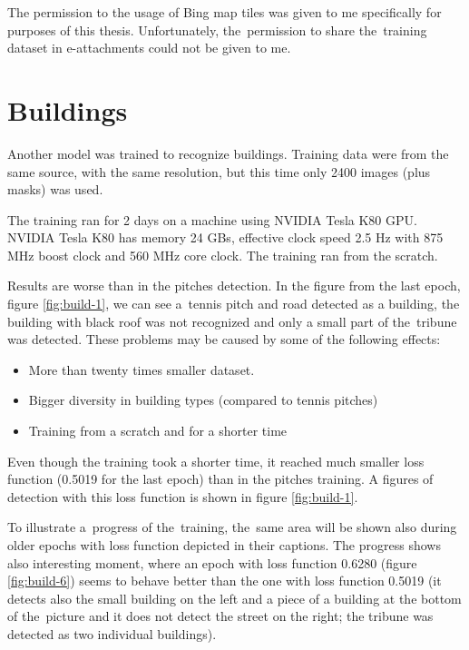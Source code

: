 The permission to the usage of Bing map tiles was given to me specifically for 
purposes of this thesis. Unfortunately, the~permission to share the~training 
dataset in e-attachments could not be given to me.

\section{Buildings}

Another model was trained to recognize buildings. Training data were from the
same source, with the same resolution, but this time only 2400 images (plus
masks) was used.

The training ran for 2 days on a machine using NVIDIA Tesla K80 GPU. NVIDIA
Tesla K80 has memory 24 GBs, effective clock speed 2.5 Hz with 875 MHz boost
clock and 560 MHz core clock. The training ran from the scratch.

Results are worse than in the pitches detection. In the figure from the last
epoch, figure \ref{fig:build-1},
we can see a~tennis pitch and road detected as a building, the building with
black roof was not recognized and only a small part of the~tribune was
detected.
These problems may be caused by some of the following effects:
\begin{itemize}
	\item More than twenty times smaller dataset.
	\item Bigger diversity in building types (compared to tennis pitches)
	\item Training from a scratch and for a shorter time
\end{itemize}

Even though the training took a shorter time, it reached much smaller loss
function (0.5019 for the last epoch) than in the pitches training. A figures of
detection with this loss
function is shown in figure \ref{fig:build-1}.

To illustrate
a~progress of the~training, the~same area will be
shown also during older epochs with loss function depicted in their captions.
The progress shows also interesting moment, where an epoch with loss function
0.6280 (figure \ref{fig:build-6}) seems to behave better than the one with loss
function 0.5019 (it detects also the small building on the left and a piece of
a building at the bottom of the~picture and it does not detect the street on
the right; the tribune was detected as two individual buildings).

